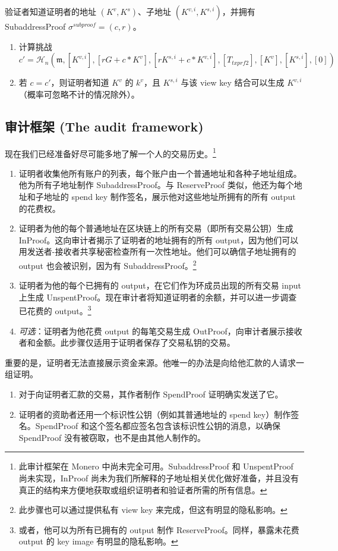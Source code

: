 验证者知道证明者的地址 $(K^v, K^s)$、子地址 $(K^{v,i}, K^{s,i})$，并拥有 SubaddressProof $\sigma^{subproof} = (c,r)$。

\begin{enumerate}
    \item 计算挑战\vspace{.175cm}
	\[c' = \mathcal{H}_n(\mathfrak{m},[K^{v,i}], [r G + c*K^v], [r K^{s,i} + c*K^{v,i}], [T_{txprf2}], [K^v], [K^{s,i}], [0])\]
    \item 若 $c = c'$，则证明者知道 $K^v$ 的 $k^v$，且 $K^{s,i}$ 与该 view key 结合可以生成 $K^{v,i}$（概率可忽略不计的情况除外）。
\end{enumerate}{}


\subsection{审计框架 (The audit framework)}
\label{subsec:audit-framework}

现在我们已经准备好尽可能多地了解一个人的交易历史。\footnote{此审计框架在 Monero 中尚未完全可用。SubaddressProof 和 UnspentProof 尚未实现，InProof 尚未为我们所解释的子地址相关优化做好准备，并且没有真正的结构来方便地获取或组织证明者和验证者所需的所有信息。}

\begin{enumerate}
    \item 证明者收集他所有账户的列表，每个账户由一个普通地址和各种子地址组成。他为所有子地址制作 SubaddressProof。与 ReserveProof 类似，他还为每个地址和子地址的 spend key 制作签名，展示他对这些地址所拥有的所有 output 的花费权。
    \item 证明者为他的每个普通地址在区块链上的所有交易（即所有交易公钥）生成 InProof。这向审计者揭示了证明者的地址拥有的所有 output，因为他们可以用发送者-接收者共享秘密检查所有一次性地址。他们可以确信子地址拥有的 output 也会被识别，因为有 SubaddressProof。\footnote{此步骤也可以通过提供私有 view key 来完成，但这有明显的隐私影响。}
    \item 证明者为他的每个已拥有的 output，在它们作为环成员出现的所有交易 input 上生成 UnspentProof。现在审计者将知道证明者的余额，并可以进一步调查已花费的 output。\footnote{或者，他可以为所有已拥有的 output 制作 ReserveProof。同样，暴露未花费 output 的 key image 有明显的隐私影响。}
    \item {\em 可选}：证明者为他花费 output 的每笔交易生成 OutProof，向审计者展示接收者和金额。此步骤仅适用于证明者保存了交易私钥的交易。
\end{enumerate}{}

重要的是，证明者无法直接展示资金来源。他唯一的办法是向给他汇款的人请求一组证明。

\begin{enumerate}
    \item 对于向证明者汇款的交易，其作者制作 SpendProof 证明确实发送了它。
    \item 证明者的资助者还用一个标识性公钥（例如其普通地址的 spend key）制作签名。SpendProof 和这个签名都应签名包含该标识性公钥的消息，以确保 SpendProof 没有被窃取，也不是由其他人制作的。
\end{enumerate}{}
